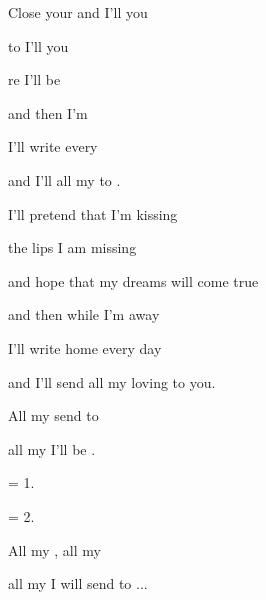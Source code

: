 

\zs
Close your  and I'll  you

to I'll  you

re I'll  be 

and then  I'm 

I'll write  every 

and I'll  all my  to .    
\ks

\zs
I'll pretend that I'm kissing

the lips I am missing

and hope that my dreams will come true

and then while I'm away

I'll write home every day

and I'll send all my loving to you.
\ks

\zr
All my   send to 

all my   I'll be .
\kr

\zs
= 1.
\ks

\zs
= 2.
\ks

\zr
All my , all my 

all my  I will send to  ...
\kr

\kp





